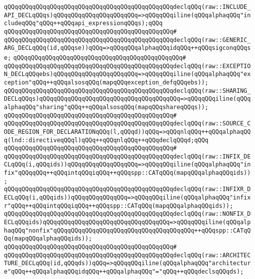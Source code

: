 \verb|qQQqqQQqqQQqqQQqqQQqqQQqqQQqqQQqqQQqqQQqqQQqqQQqdeclqQQq(raw::INCLUDE_API_DECLqQQqs)qQQqqQQqqQQqqQQqqQQqqQQq=>qQQqqQQqiline(qQQqalphaqQQq"includeqQQq"qQQq++qQQqapi_expressionqQQqs);qQQq|\newline
\verb|qQQqqQQqqQQqqQQqqQQqqQQqqQQqqQQqqQQqqQQqqQQqqQQq#|\newline
\verb|qQQqqQQqqQQqqQQqqQQqqQQqqQQqqQQqqQQqqQQqqQQqqQQqdeclqQQq(raw::GENERIC_ARG_DECLqQQq(id,qQQqse))qQQq=>qQQqqQQqalphaqQQqidqQQq++qQQqsigconqQQqse;|\newline
\verb|qQQqqQQqqQQqqQQqqQQqqQQqqQQqqQQqqQQqqQQqqQQqqQQq#|\newline
\verb|qQQqqQQqqQQqqQQqqQQqqQQqqQQqqQQqqQQqqQQqqQQqqQQqdeclqQQq(raw::EXCEPTION_DECLqQQqebs)qQQqqQQqqQQqqQQqqQQqqQQq=>qQQqqQQqiline(qQQqalphaqQQq"exception"qQQq++qQQqalsosqQQq(mapqQQqexception_defqQQqebs));|\newline
\verb|qQQqqQQqqQQqqQQqqQQqqQQqqQQqqQQqqQQqqQQqqQQqqQQqdeclqQQq(raw::SHARING_DECLqQQqs)qQQqqQQqqQQqqQQqqQQqqQQqqQQqqQQqqQQqqQQq=>qQQqqQQqiline(qQQqalphaqQQq"sharing"qQQq++qQQqalsosqQQq(mapqQQqshareqQQqs));|\newline
\verb|qQQqqQQqqQQqqQQqqQQqqQQqqQQqqQQqqQQqqQQqqQQqqQQq#|\newline
\verb|qQQqqQQqqQQqqQQqqQQqqQQqqQQqqQQqqQQqqQQqqQQqqQQqdeclqQQq(raw::SOURCE_CODE_REGION_FOR_DECLARATIONqQQq(l,qQQqd))qQQq=>qQQqnlqQQq++qQQqalphaqQQq(lnd::directiveqQQql)qQQq++qQQqnlqQQq++qQQqdeclqQQqd;qQQq|\newline
\verb|qQQqqQQqqQQqqQQqqQQqqQQqqQQqqQQqqQQqqQQqqQQqqQQq#|\newline
\verb|qQQqqQQqqQQqqQQqqQQqqQQqqQQqqQQqqQQqqQQqqQQqqQQqdeclqQQq(raw::INFIX_DECLqQQq(i,qQQqids))qQQqqQQqqQQqqQQqqQQq=>qQQqqQQqiline(qQQqalphaqQQq"infix"qQQqqQQq++qQQqintqQQqiqQQq++qQQqspp::CATqQQq(mapqQQqalphaqQQqids));|\newline
\verb|qQQqqQQqqQQqqQQqqQQqqQQqqQQqqQQqqQQqqQQqqQQqqQQqdeclqQQq(raw::INFIXR_DECLqQQq(i,qQQqids))qQQqqQQqqQQqqQQq=>qQQqqQQqiline(qQQqalphaqQQq"infixr"qQQq++qQQqintqQQqiqQQq++qQQqspp::CATqQQq(mapqQQqalphaqQQqids));|\newline
\verb|qQQqqQQqqQQqqQQqqQQqqQQqqQQqqQQqqQQqqQQqqQQqqQQqdeclqQQq(raw::NONFIX_DECLqQQqids)qQQqqQQqqQQqqQQqqQQqqQQqqQQqqQQqqQQq=>qQQqqQQqiline(qQQqalphaqQQq"nonfix"qQQqqQQqqQQqqQQqqQQqqQQqqQQqqQQqqQQqqQQq++qQQqspp::CATqQQq(mapqQQqalphaqQQqids));|\newline
\verb|qQQqqQQqqQQqqQQqqQQqqQQqqQQqqQQqqQQqqQQqqQQqqQQq#|\newline
\verb|qQQqqQQqqQQqqQQqqQQqqQQqqQQqqQQqqQQqqQQqqQQqqQQqdeclqQQq(raw::ARCHITECTURE_DECLqQQq(id,qQQqds))qQQq=>qQQqqQQqiline(qQQqalphaqQQq"architecture"qQQq++qQQqalphaqQQqidqQQq++qQQqalphaqQQq"="qQQq++qQQqdeclsqQQqds);|\newline
